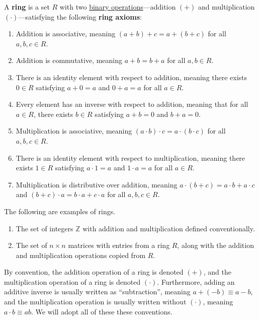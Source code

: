 \documentclass{scrartcl}
\begin{document}
\begin{definition}[Ring]
    \label{def:ring}
    \newcommand{\Z}{\mathbb{Z}}
    A \textbf{ring} is a set $R$ with two \hyperref[def:binary operation]{binary operations}---addition $(+)$ and
    multiplication $(\cdot)$---satisfying the following \textbf{ring axioms}:
    \begin{enumerate}
        \item Addition is associative, meaning $(a+b)+c=a+(b+c)$ for all $a,b,c\in R$.
        \item Addition is commutative, meaning $a+b=b+a$ for all $a,b\in R$.

        \item
            There is an identity element with respect to addition, meaning there exists $0\in R$ satisfying $a+0=a$ and
            $0+a=a$ for all $a\in R$.

        \item
            Every element has an inverse with respect to addition, meaning that for all $a\in R$, there exists $b\in R$
            satisfying $a+b=0$ and $b+a=0$.

        \item Multiplication is associative, meaning $(a\cdot b)\cdot c=a\cdot (b\cdot c)$ for all $a,b,c\in R$.

        \item
            There is an identity element with respect to multiplication, meaning there exists $1\in R$ satisfying
            $a\cdot 1=a$ and $1\cdot a=a$ for all $a\in R$.

        \item
            Multiplication is distributive over addition, meaning $a\cdot (b+c)=a\cdot b+a\cdot c$ and
            $(b+c)\cdot a=b\cdot a+c\cdot a$ for all $a,b,c\in R$.
    \end{enumerate}

    The following are examples of rings.
    \begin{enumerate}
        \item The set of integers $\Z$ with addition and multiplication defined conventionally.
        \item
            The set of $n\times n$ matrices with entries from a ring $R$, along with the addition and multiplication
            operations copied from $R$.
    \end{enumerate}

    By convention, the addition operation of a ring is denoted $(+)$, and the multiplication operation of a ring is
    denoted $(\cdot)$.
    Furthermore, adding an additive inverse is usually written as ``subtraction'', meaning $a+(-b)\equiv a-b$, and the
    multiplication operation is usually written without $(\cdot)$, meaning $a\cdot b\equiv ab$.
    We will adopt all of these these conventions.


\end{definition}
\end{document}
